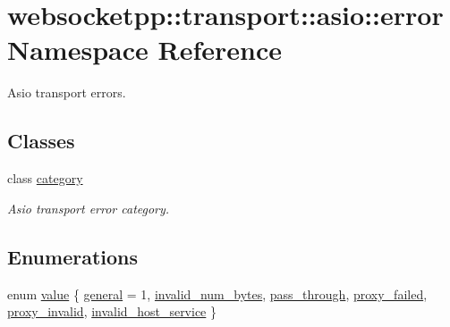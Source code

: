 \hypertarget{namespacewebsocketpp_1_1transport_1_1asio_1_1error}{}\section{websocketpp\+:\+:transport\+:\+:asio\+:\+:error Namespace Reference}
\label{namespacewebsocketpp_1_1transport_1_1asio_1_1error}


Asio transport errors.  


\subsection*{Classes}
\begin{DoxyCompactItemize}
\item 
class \mbox{\hyperlink{classwebsocketpp_1_1transport_1_1asio_1_1error_1_1category}{category}}
\begin{DoxyCompactList}\small\item\em Asio transport error category. \end{DoxyCompactList}\end{DoxyCompactItemize}
\subsection*{Enumerations}
\begin{DoxyCompactItemize}
\item 
enum \mbox{\hyperlink{namespacewebsocketpp_1_1transport_1_1asio_1_1error_aeb44b27fc0ffac2a8991bf629cbfd045}{value}} \{ \newline
\mbox{\hyperlink{namespacewebsocketpp_1_1transport_1_1asio_1_1error_aeb44b27fc0ffac2a8991bf629cbfd045a883593fb292745d5e7dc0edb402fd23a}{general}} = 1, 
\mbox{\hyperlink{namespacewebsocketpp_1_1transport_1_1asio_1_1error_aeb44b27fc0ffac2a8991bf629cbfd045ac5a5a94c79697f82d95d1f6d3a35e02c}{invalid\+\_\+num\+\_\+bytes}}, 
\mbox{\hyperlink{namespacewebsocketpp_1_1transport_1_1asio_1_1error_aeb44b27fc0ffac2a8991bf629cbfd045a46f70de40cb49260f1d5aa454b4ecb78}{pass\+\_\+through}}, 
\mbox{\hyperlink{namespacewebsocketpp_1_1transport_1_1asio_1_1error_aeb44b27fc0ffac2a8991bf629cbfd045a70868b579b442f39074623c5072f86a0}{proxy\+\_\+failed}}, 
\newline
\mbox{\hyperlink{namespacewebsocketpp_1_1transport_1_1asio_1_1error_aeb44b27fc0ffac2a8991bf629cbfd045a41380a32ff02e5e43a1ced0318c2f357}{proxy\+\_\+invalid}}, 
\mbox{\hyperlink{namespacewebsocketpp_1_1transport_1_1asio_1_1error_aeb44b27fc0ffac2a8991bf629cbfd045afd008efc340690681fb451d7a4cc8029}{invalid\+\_\+host\+\_\+service}}
 \}
\end{DoxyCompactItemize}

